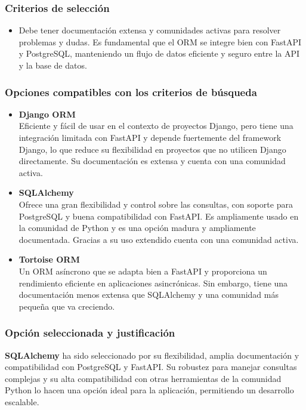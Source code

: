 \subsubsection{Criterios de selección}
\begin{itemize}
    \item Debe tener documentación extensa y comunidades activas para resolver problemas y dudas. Es fundamental que el ORM se integre bien con FastAPI y PostgreSQL, manteniendo un flujo de datos eficiente y seguro entre la API y la base de datos.
\end{itemize}

\subsubsection{Opciones compatibles con los criterios de búsqueda}
\begin{itemize}
    \item \textbf{Django ORM}\\
        Eficiente y fácil de usar en el contexto de proyectos Django, pero tiene una integración limitada con FastAPI y depende fuertemente del framework Django, lo que reduce su flexibilidad en proyectos que no utilicen Django directamente. Su documentación es extensa y cuenta con una comunidad activa.
    \item \textbf{SQLAlchemy}\\
        Ofrece una gran flexibilidad y control sobre las consultas, con soporte para PostgreSQL y buena compatibilidad con FastAPI. Es ampliamente usado en la comunidad de Python y es una opción madura y ampliamente documentada. Gracias a su uso extendido cuenta con una comunidad activa.
    \item \textbf{Tortoise ORM}\\
        Un ORM asíncrono que se adapta bien a FastAPI y proporciona un rendimiento eficiente en aplicaciones asincrónicas. Sin embargo, tiene una documentación menos extensa que SQLAlchemy y una comunidad más pequeña que va creciendo.
\end{itemize}

\subsubsection{Opción seleccionada y justificación}
\textbf{SQLAlchemy} ha sido seleccionado por su flexibilidad, amplia documentación y compatibilidad con PostgreSQL y FastAPI. Su robustez para manejar consultas complejas y su alta compatibilidad con otras herramientas de la comunidad Python lo hacen una opción ideal para la aplicación, permitiendo un desarrollo escalable.


